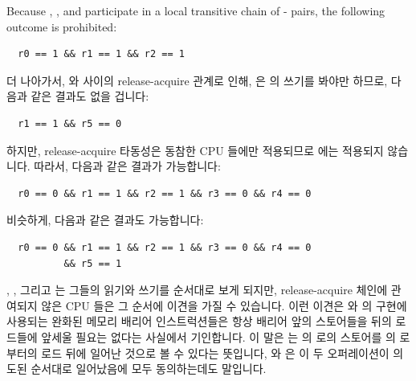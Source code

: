 \begin{enumerate}
Because , , and  participate in a local transitive
chain of - pairs, the following
outcome is prohibited:
\fi

{\scriptsize
\begin{verbatim}
  r0 == 1 && r1 == 1 && r2 == 1
\end{verbatim}
}

더 나아가서,  와  사이의 release-acquire 관계로 인해,
 은  의 쓰기를 봐야만 하므로, 다음과 같은 결과도 없을
겁니다:

{\scriptsize
\begin{verbatim}
  r1 == 1 && r5 == 0
\end{verbatim}
}

하지만, release-acquire 타동성은 동참한 CPU 들에만 적용되므로  에는
적용되지 않습니다.  따라서, 다음과 같은 결과가 가능합니다:

{\scriptsize
\begin{verbatim}
  r0 == 0 && r1 == 1 && r2 == 1 && r3 == 0 && r4 == 0
\end{verbatim}
}

비슷하게, 다음과 같은 결과도 가능합니다:

{\scriptsize
\begin{verbatim}
  r0 == 0 && r1 == 1 && r2 == 1 && r3 == 0 && r4 == 0
          && r5 == 1
\end{verbatim}
}

, , 그리고  는 그들의 읽기와 쓰기를 순서대로
보게 되지만, release-acquire 체인에 관여되지 않은 CPU 들은 그 순서에 이견을
가질 수 있습니다.  이런 이견은  와
 의 구현에 사용되는 완화된 메모리 배리어 인스트럭션들은
항상 배리어 앞의 스토어들을 뒤의 로드들에 앞세울 필요는 없다는 사실에서
기인합니다.  이 말은  는  의  로의 스토어를
 의  로부터의 로드 뒤에 일어난 것으로 볼 수 있다는 뜻입니다,
 와  은 이 두 오퍼레이션이 의도된 순서대로 일어났음에
모두 동의하는데도 말입니다.


\end{enumerate}
